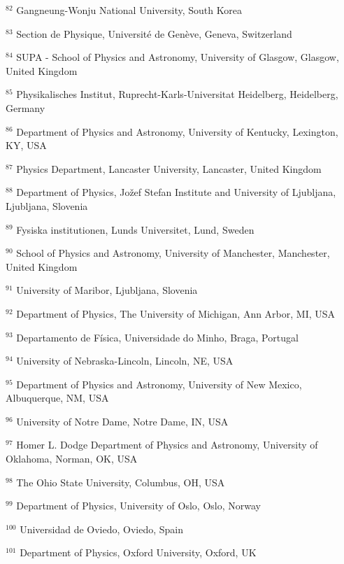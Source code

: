 \par {\footnotesize $^{82}$ Gangneung-Wonju National University, South Korea}
\par {\footnotesize $^{83}$ Section de Physique, Université de Genève, Geneva, Switzerland}
\par {\footnotesize $^{84}$ SUPA - School of Physics and Astronomy, University of Glasgow, Glasgow, United Kingdom}
\par {\footnotesize $^{85}$ Physikalisches Institut, Ruprecht-Karls-Universitat Heidelberg, Heidelberg, Germany}
\par {\footnotesize $^{86}$ Department of Physics and Astronomy, University of Kentucky, Lexington, KY, USA}
\par {\footnotesize $^{87}$ Physics Department, Lancaster University, Lancaster, United Kingdom}
\par {\footnotesize $^{88}$ Department of Physics, Jožef Stefan Institute and University of Ljubljana, Ljubljana, Slovenia}
\par {\footnotesize $^{89}$ Fysiska institutionen, Lunds Universitet, Lund, Sweden}
\par {\footnotesize $^{90}$ School of Physics and Astronomy, University of Manchester, Manchester, United Kingdom}
\par {\footnotesize $^{91}$ University of Maribor, Ljubljana, Slovenia}
\par {\footnotesize $^{92}$ Department of Physics, The University of Michigan, Ann Arbor, MI, USA}
\par {\footnotesize $^{93}$ Departamento de Física, Universidade do Minho, Braga, Portugal}
\par {\footnotesize $^{94}$ University of Nebraska-Lincoln, Lincoln, NE, USA}
\par {\footnotesize $^{95}$ Department of Physics and Astronomy, University of New Mexico, Albuquerque, NM, USA}
\par {\footnotesize $^{96}$ University of Notre Dame, Notre Dame, IN, USA}
\par {\footnotesize $^{97}$ Homer L. Dodge Department of Physics and Astronomy, University of Oklahoma, Norman, OK, USA}
\par {\footnotesize $^{98}$ The Ohio State University, Columbus, OH, USA}
\par {\footnotesize $^{99}$ Department of Physics, University of Oslo, Oslo, Norway}
\par {\footnotesize $^{100}$ Universidad de Oviedo, Oviedo, Spain}
\par {\footnotesize $^{101}$ Department of Physics, Oxford University, Oxford, UK}
